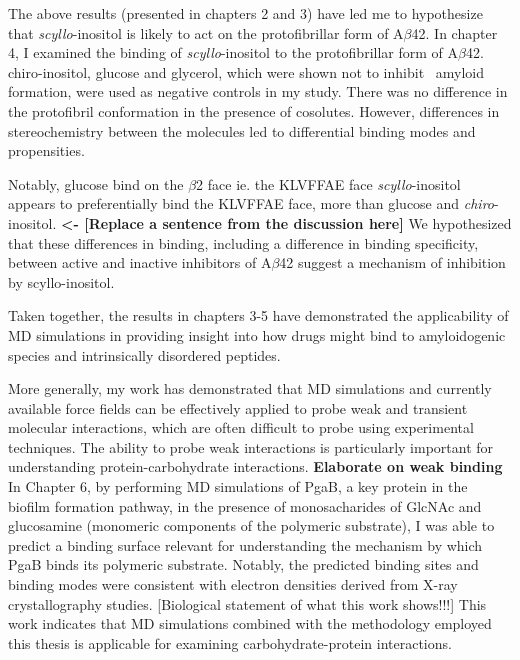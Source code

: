 The above results (presented in chapters 2 and 3) have led me to hypothesize that \textit{scyllo}-inositol is likely to act on the protofibrillar form of A$\beta$42.  In chapter 4, I examined the binding of \textit{scyllo}-inositol to the protofibrillar form of A$\beta$42. chiro-inositol, glucose and glycerol, which were shown not to inhibit \ amyloid formation, were used as negative controls in my study. There was no difference in the protofibril conformation in the presence of cosolutes. However, differences in stereochemistry between the molecules led to differential binding modes and propensities. 

Notably, glucose bind on the $\beta$2 face ie. the KLVFFAE face \textit{scyllo}-inositol appears to preferentially bind the KLVFFAE face, more than glucose and \textit{chiro}-inositol.  \textbf{<- [Replace a sentence from the discussion here]}  
We hypothesized that these differences in binding, including a difference in binding specificity, between active and inactive inhibitors of A$\beta$42 suggest a mechanism of inhibition by scyllo-inositol.

Taken together, the results in chapters 3-5 have demonstrated the applicability of MD simulations in providing insight into how drugs might bind to amyloidogenic species and intrinsically disordered peptides. 

More generally, my work has demonstrated that MD simulations and currently available force fields can be effectively applied to probe weak and transient molecular interactions, which are often difficult to probe using experimental techniques. The ability to probe weak interactions is particularly important for understanding protein-carbohydrate interactions.\cite{weak binding review paper} \textbf{Elaborate on weak binding} In Chapter 6, by performing MD simulations of PgaB, a key protein in the biofilm formation pathway, in the presence of monosacharides of GlcNAc and glucosamine (monomeric components of the polymeric substrate), I was able to predict a binding surface relevant for understanding the mechanism by which PgaB binds its polymeric substrate. Notably, the predicted binding sites and binding modes were consistent with electron densities derived from X-ray crystallography studies. [Biological statement of what this work shows!!!] This work indicates that MD simulations combined with the methodology employed this thesis is applicable for examining carbohydrate-protein interactions.

